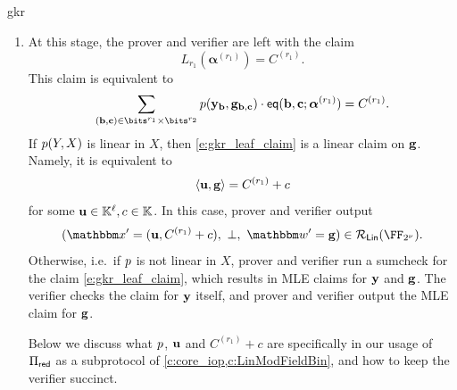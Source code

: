 \begin{lncsappendix}{gkr}
\begin{construction}
\begin{enumerate}[leftmargin=*]
\begin{enumerate}[leftmargin=*]
    for some $\rr_\bb^{(i)}\in \comfield^{i}$, $\rr_\cc^{(i)}\in \comfield^{r_2}$ and $a_{0}^{(i)},a_{1}^{(i)}\in \comfield$.
    \item \textbf{$i$-th unification step.} The prover and verifier unify the two claims from \eqref{e:gkr_intermediate} into a single one via the following standard procedure:
    \begin{enumerate}[leftmargin=*]
        \item The verifier sends a random element $\beta^{(i)}\in\KK$.
        \item The claim \eqref{e:gkr_intermediate} is replaced by
        $$
        L_{i+1}(\beta^{(i)},\rr_\bb^{(i)},\rr_{\cc}^{(i)}) = C^{(i+1)} \defeq a_0^{(i)} \cdot (1-\beta^{(i)}) + a_1^{(i)} \cdot \beta^{(i)}.
        $$
        Let 
        $$
        \bm{\alpha}^{(i+1)} \defeq (\beta^{(i)},\rr_\bb^{(i)},\rr_{\cc}^{(i)}).
        $$
    \end{enumerate}
    \end{enumerate}
    \item At this stage, the prover and verifier are left with the claim
    $$
    L_{r_1}(\bm{\alpha}^{(r_1)}) = C^{(r_1)}.
    $$
    This claim is equivalent to
    \begin{equation}\label{e:gkr_leaf_claim}
    \sum_{(\bb,\cc)\in \bits^{r_1} \times \bits^{r_2}} \gkrpol(\yy_{\bb},\bfg_{\bb,\cc}) \cdot \eq(\bb,\cc;\bm{\alpha}^{(r_1)}) = C^{(r_1)}.
    \end{equation}
    If $p(Y,X)$ is linear in $X$, then \eqref{e:gkr_leaf_claim} is a linear claim on $\mathbf{g}$. Namely, it is equivalent to
    $$
    \langle \mathbf{u}, \mathbf{g} \rangle = C^{(r_1)} + c
    $$
    for some $\mathbf{u}\in \mathbb{K}^{\ell}, c\in \mathbb{K}$. In this case, prover and verifier output 
        $$
    (\inp'=(\uu, C^{(r_1)}+c),\ \bot, \ \wit' = \bfg) \in \LIN(\comfield).
    $$
    Otherwise, i.e.\ if $p$ is not linear in $X$, prover and verifier run a sumcheck for the claim \eqref{e:gkr_leaf_claim}, which results in MLE claims for $\mathbf{y}$ and $\mathbf{g}$. The verifier checks the claim for $\mathbf{y}$ itself, and prover and verifier output the MLE claim for $\mathbf{g}$.

    Below we discuss what $p$, $\mathbf{u}$ and $C^{(r_1)}+c$ are specifically in our usage of $\Pi_{\mathsf{red}}$ as a subprotocol of \cref{c:core_iop,c:LinModFieldBin}, and how to keep the verifier succinct.
\end{enumerate}
    
\end{construction}


\end{lncsappendix}
